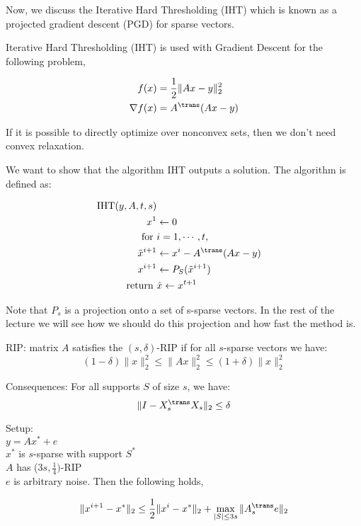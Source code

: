 Now, we discuss the Iterative Hard Thresholding (IHT) which is known as a projected gradient descent (PGD) for sparse vectors.

Iterative Hard Thresholding (IHT) is used with Gradient Descent for the following problem,

\begin{align}
f(x) &= \frac{1}{2} \| Ax - y \|_2^2 \\
\nabla f(x) &= A^{\trans}(Ax - y)
\end{align}

If it is possible to directly optimize over nonconvex sets, then we don't need convex relaxation.

We want to show that the algorithm IHT outputs a solution. The algorithm is defined as:

\begin{align*}
\text{IHT}(y, A, t, s) \\
x^1 &\leftarrow 0 \\
\text{ for } &i=1 ,\cdots, t, \\
\tilde{x}^{i+1} &\leftarrow x^i - A^{\trans} (Ax - y) \\
x^{i+1} &\leftarrow P_S( \tilde{x}^{i+1} ) \\
\text{ return }& \hat{x} \leftarrow x^{t+1}
\end{align*}

Note that $P_s$ is a projection onto a set of s-sparse vectors. In the rest of the lecture we will see how we should do this projection and how fast the method is.

RIP: matrix $A$ satisfies the $(s,\delta)$-RIP if for all $s$-sparse vectors we have:
$$(1-\delta) \|x\|_2^2 \leq \|Ax\|_2^2 \leq (1+\delta)\|x\|_2^2$$

Consequences: For all supports $S$ of size $s$, we have:
$$\|I-X_s^{\trans} X_s\|_2 \leq \delta$$

Setup: \\
$y = Ax^* + e$ \\
$x^*$ is $s$-sparse with support $S^*$ \\ 
$A$ has ($3s,\frac{1}{4})$-RIP \\
$e$ is arbitrary noise.
Then the following holds,
\begin{theorem}
$$\|x^{i+1}-x^*\|_2 \leq \frac{1}{2} \|x^{i}-x^*\|_2 + \max_{|S| \leq 3s} \|A_s^{\trans} e\|_2$$
\end{theorem}

